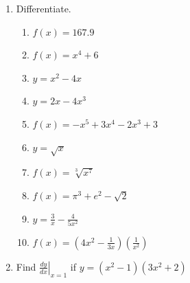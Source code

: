 \documentclass[12pt]{article}
\newif\ifans
\begin{document}
\begin{enumerate}

\item Differentiate.

\begin{enumerate}

\item $f(x)=167.9$

\ifans{\fbox{$f^{\prime}(x)=0$}} \fi

\item $f(x)=x^4+6$

\ifans{\fbox{$f^{\prime}(x)=4x^3$}} \fi

\item $y=x^2-4x$

\ifans{\fbox{$\displaystyle \frac{dy}{dx}=2x-4$}} \fi

\item $y=2x-4x^3$

\ifans{\fbox{$y^{\prime}=2-12x^2$}} \fi

\item $f(x)=-x^5+3x^4-2x^3+3$

\ifans{\fbox{$y^{\prime}=-5x^4+12x^3-6x^2$}} \fi

\item $y=\sqrt{x}$

\ifans{\fbox{$\displaystyle y^{\prime}=\frac{1}{2\sqrt{x}}$}} \fi

\item $\displaystyle f(x)=\sqrt[3]{x^7}$

\ifans{\fbox{$\displaystyle \frac{dy}{dx}=\frac{7}{3}x^{4/3}$}} \fi

\item $f(x)= \pi^3+e^2-\sqrt{2}$

\ifans{\fbox{$\displaystyle f^{\prime}(x)=0$}} \fi

\item $\displaystyle y=\frac{3}{x}-\frac{4}{5x^2}$

\ifans{\fbox{$\displaystyle y^{\prime}=-\frac{3}{x^2}+\frac{8}{5x^3}$}} \fi

\item $\displaystyle f(x)=\left(4x^2-\frac{1}{3x}\right)\left(\frac{1}{x^2}\right)$

\ifans{\fbox{$\displaystyle f^{\prime}(x)=\frac{1}{x^4}$}} \fi

\end{enumerate}

\item Find $\displaystyle \left.\frac{dy}{dx}\right|_{x=1}$ if $y=(x^2-1)(3x^2+2)$


\end{enumerate}
\end{document}
